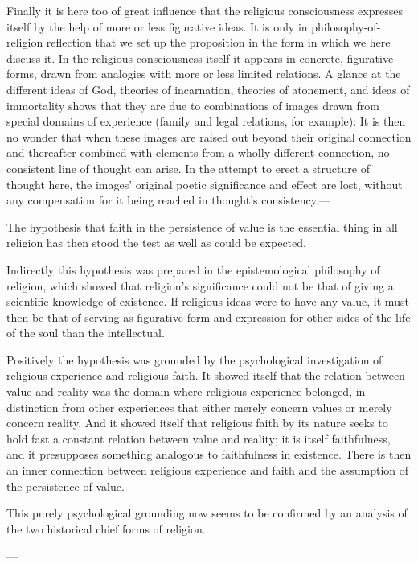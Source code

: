 \documentclass[12pt,a4paper]{book}
\newcommand{\opage}[1]{\marginnote{\footnotesize\textit{[#1]}}}
\begin{document}
Finally it is here too of great influence that the religious consciousness expresses itself by the
help of more or less figurative ideas. It is only in philosophy-of-religion reflection that we set
up the proposition in the form in which we here discuss it. In the religious consciousness itself
it appears in concrete, figurative forms, drawn from analogies with more or less limited relations.
A glance at the different ideas of God, theories of incarnation, theories of atonement, and ideas
of immortality shows that they are due to combinations of images drawn from special domains of
experience (family and legal relations, for example). It is then no wonder that when these images
are raised out beyond their original connection and thereafter combined with elements from a wholly
different connection, no consistent line of thought can arise. In the attempt to erect a structure
of thought here, the images' original poetic significance and effect are lost, without any
compensation for it being reached in thought's consistency.---

The hypothesis that faith in the persistence of value is the essential thing in all religion has
then stood the test as well as could be expected.

\opage{165}Indirectly this hypothesis was prepared in the epistemological philosophy of religion, which showed
that religion's significance could not be that of giving a scientific knowledge of existence. If
religious ideas were to have any value, it must then be that of serving as figurative form and
expression for other sides of the life of the soul than the intellectual.

Positively the hypothesis was grounded by the psychological investigation of religious experience
and religious faith. It showed itself that the relation between value and reality was the domain
where religious experience belonged, in distinction from other experiences that either merely
concern values or merely concern reality. And it showed itself that religious faith by its nature
seeks to hold fast a constant relation between value and reality; it is itself faithfulness, and it
presupposes something analogous to faithfulness in existence. There is then an inner connection
between religious experience and faith and the assumption of the persistence of value.

This purely psychological grounding now seems to be confirmed by an analysis of the two historical
chief forms of religion.

\begin{center}---\end{center}
\end{document}
